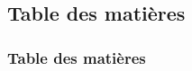 \documentclass[xcolor*pst]{beamer}
\title{}
\author{}
\institute{Catopuma}
\begin{document}
  
  
  
  \begin{frame}
    \section*{Table des matières}
    \frametitle{Table des matières} 
    \tableofcontents
  \end{frame}
  
  
\end{document}
